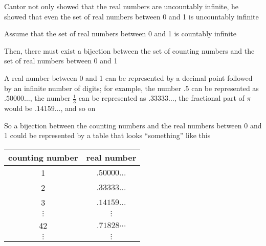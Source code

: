 \documentclass[8pt,a4paper,compress]{beamer}
\begin{document}
\begin{frame}[fragile]
\pause

Cantor not only showed that the real numbers are uncountably infinite, he showed that even the set of real numbers between 0 and 1 is uncountably infinite

\pause
\bigskip

Assume that the set of real numbers between 0 and 1 is countably infinite

\pause
\bigskip

Then, there must exist a bijection between the set of counting numbers and the set of real numbers between 0 and 1

\pause
\bigskip

A real number between 0 and 1 can be represented by a decimal point followed by an infinite number of digits; for example, the number $.5$ can be represented as $.50000\dots$, the number $\frac{1}{3}$ can be represented as $.33333\dots$, the fractional part of $\pi$ would be $.14159\dots$, and so on

\pause
\bigskip

So a bijection between the counting numbers and the real numbers between 0 and 1 could be represented by a table that looks ``something'' like this
\begin{center}
\begin{tabular}{c|c}
counting number & real number \\ \hline
1 & $.50000\dots$ \\ 
2 & $.33333\dots$ \\
3 & $.14159\dots$ \\ 
$\vdots$ & $\vdots$ \\
42 & $.71828\cdots$ \\
$\vdots$ & $\vdots$
\end{tabular}
\end{center}
\end{frame}
\end{document}
